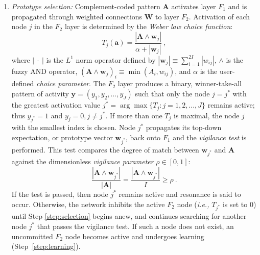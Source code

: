 \begin{enumerate}
		\item \emph{Prototype selection:} Complement-coded pattern $\textbf{A}$ activates layer $F_1$ and is propagated through weighted connections $\textbf{W}$ to layer $F_2$. Activation of each node $j$ in the $F_2$ layer is determined by the \emph{Weber law choice function}:
		\begin{equation}
			\label{eq:c1_choice}
			T_j(\textbf{a}) = \frac{ |\textbf{A} \wedge \textbf{w}_j| }
														{ \alpha + |\textbf{w}_j|          } \ ,
		\end{equation}
		where $|\ \cdot\ |$ is the $L^1$ norm operator defined by $|\textbf{w}_j| 
		\equiv \sum_{i=1}^{2I} |w_{ij}|$, $\wedge$ is the fuzzy AND operator,
		$(\textbf{A} \wedge \textbf{w}_j)_i \equiv \min(A_i,w_{ij})$, and $\alpha$ is the user-defined \emph{choice parameter}.
		The $F_2$ layer produces a binary, winner-take-all pattern of activity $\textbf{y} = (y_1, y_2, ..., y_J)$ such that only the node $j = j^*$ with
		the greatest activation value $j^* = \arg \max \{T_j : j = 1, 2, ..., J\}$ remains active; thus $y_{j^*} = 1$ and $y_j = 0, j \neq j^*$. If more than one $T_j$ is maximal, the node $j$ with the smallest index is chosen.
		Node $j^*$ propagates its top-down expectation, or prototype vector $\textbf{w}_{j^*}$, back onto $F_1$ and the \emph{vigilance test} is performed.
		This test compares the degree of match between $\textbf{w}_{j^*}$ and
		$\textbf{A}$ against the dimensionless \emph{vigilance parameter} $\rho
		\in [0,1]$:
		\begin{equation}\label{eq:c1_vigilance}
				\frac{|\textbf{A} \wedge \textbf{w}_{j^*}|}{|\textbf{A}|} =
				\frac{|\textbf{A} \wedge \textbf{w}_{j^*}|}{I} \geq \rho \ .
		\end{equation}
		If the test is passed, then node $j^*$ remains active and resonance is said
		to occur. Otherwise, the network inhibits the active $F_2$ node ({\em \emph{i.e.},}
		$T_{j^*}$ is set to 0) until Step \ref{step:selection} begins anew, and
		continues searching for another node $j^*$ that passes the vigilance test.
		If such a node does not exist, an uncommitted $F_2$ node becomes active and undergoes learning (Step~\ref{step:learning}).
		\label{step:selection}


\end{enumerate}
